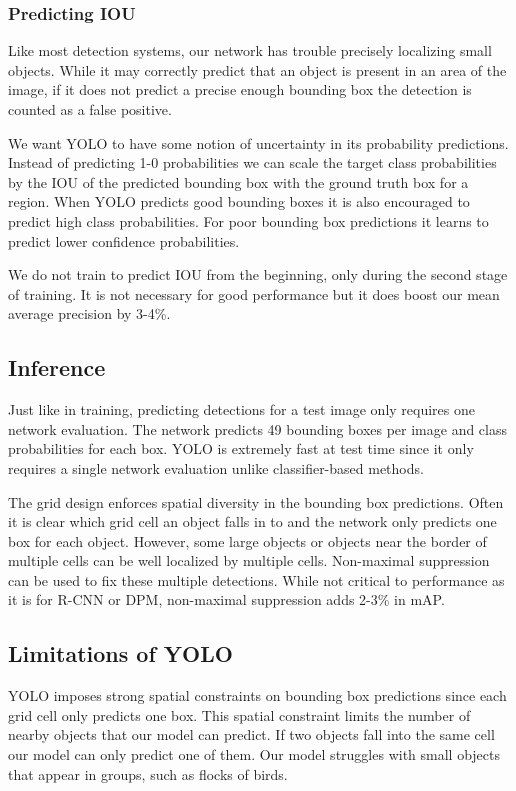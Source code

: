 \documentclass{article} %
\begin{document}
\subsubsection{Predicting IOU}

Like most detection systems, our network has trouble precisely localizing small objects. While it may correctly predict that an object is present in an area of the image, if it does not predict a precise enough bounding box the detection is counted as a false positive.

We want YOLO to have some notion of uncertainty in its probability predictions. Instead of predicting 1-0 probabilities we can scale the target class probabilities by the IOU of the predicted bounding box with the ground truth box for a region. When YOLO predicts good bounding boxes it is also encouraged to predict high class probabilities. For poor bounding box predictions it learns to predict lower confidence probabilities.

We do not train to predict IOU from the beginning, only during the second stage of training. It is not necessary for good performance but it does boost our mean average precision by 3-4\%.

\subsection{Inference}

Just like in training, predicting detections for a test image only requires one network evaluation. The network predicts 49 bounding boxes per image and class probabilities for each box. YOLO is extremely fast at test time since it only requires a single network evaluation unlike classifier-based methods.

The grid design enforces spatial diversity in the bounding box predictions. Often it is clear which grid cell an object falls in to and the network only predicts one box for each object. However, some large objects or objects near the border of multiple cells can be well localized by multiple cells. Non-maximal suppression can be used to fix these multiple detections. While not critical to performance as it is for R-CNN or DPM, non-maximal suppression adds 2-3\% in mAP.

\subsection{Limitations of YOLO}

YOLO imposes strong spatial constraints on bounding box predictions since each grid cell only predicts one box. This spatial constraint limits the number of nearby objects that our model can predict. If two objects fall into the same cell our model can only predict one of them. Our model struggles with small objects that appear in groups, such as flocks of birds.
\end{document}
